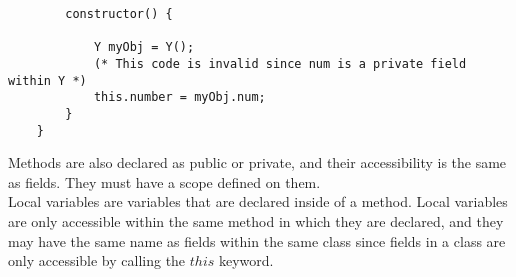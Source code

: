 \begin{homeworkProblem}
\begin{verbatim}
		constructor() {
	
			Y myObj = Y();
			(* This code is invalid since num is a private field within Y *)
			this.number = myObj.num;  
		}
	}
	\end{verbatim}

	Methods are also declared as public or private, and their accessibility is the same as fields. They must have a scope defined on them. \\
	
	Local variables are variables that are declared inside of a method. Local variables are only accessible within the same method in which they are declared, and they may have the same name as fields within the same class since fields in a class are only accessible by calling the $this$ keyword.\\
		
\end{homeworkProblem}
